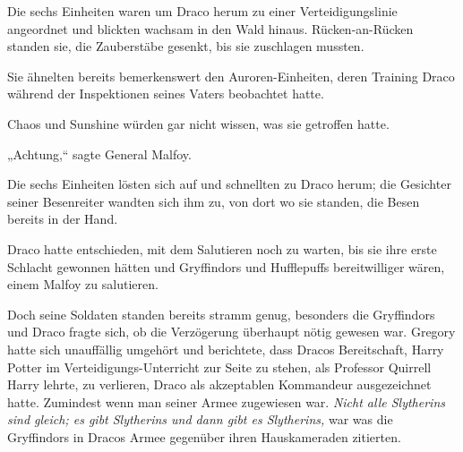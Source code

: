 Die sechs Einheiten waren um Draco herum zu einer Verteidigungslinie angeordnet und blickten wachsam in den Wald hinaus. Rücken-an-Rücken standen sie, die Zauberstäbe gesenkt, bis sie zuschlagen mussten.

Sie ähnelten bereits bemerkenswert den Auroren-Einheiten, deren Training Draco während der Inspektionen seines Vaters beobachtet hatte.

Chaos und Sunshine würden gar nicht wissen, was sie getroffen hatte.

„Achtung,“ sagte General Malfoy.

Die sechs Einheiten lösten sich auf und schnellten zu Draco herum; die Gesichter seiner Besenreiter wandten sich ihm zu, von dort wo sie standen, die Besen bereits in der Hand.

Draco hatte entschieden, mit dem Salutieren noch zu warten, bis sie ihre erste Schlacht gewonnen hätten und Gryffindors und Hufflepuffs bereitwilliger wären, einem Malfoy zu salutieren.

Doch seine Soldaten standen bereits stramm genug, besonders die Gryffindors und Draco fragte sich, ob die Verzögerung überhaupt nötig gewesen war. Gregory hatte sich unauffällig umgehört und berichtete, dass Dracos Bereitschaft, Harry Potter im Verteidigungs-Unterricht zur Seite zu stehen, als Professor Quirrell Harry lehrte, zu verlieren, Draco als akzeptablen Kommandeur ausgezeichnet hatte. Zumindest wenn man seiner Armee zugewiesen war. \emph{Nicht alle Slytherins sind gleich; es gibt Slytherins und dann gibt es Slytherins,} war was die Gryffindors in Dracos Armee gegenüber ihren Hauskameraden zitierten.

